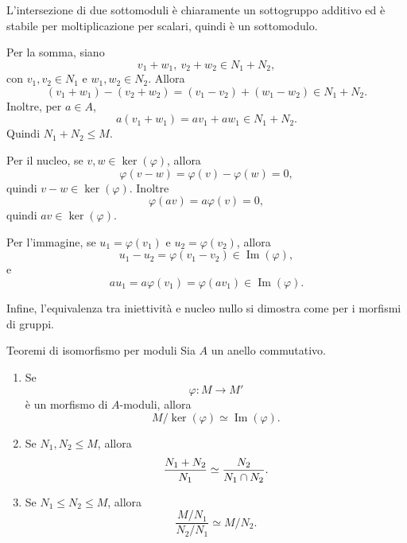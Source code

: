 \documentclass[a4paper]{article}
\begin{document}
\begin{radioactive}
\begin{snippetproof}{}
    L'intersezione di due sottomoduli è chiaramente un sottogruppo additivo ed è stabile per moltiplicazione per scalari, quindi è un sottomodulo.

    Per la somma, siano
    \[
        v_1+w_1,\ v_2+w_2\in N_1+N_2,
    \]
    con \(v_1,v_2\in N_1\) e \(w_1,w_2\in N_2\). Allora
    \[
        (v_1+w_1)-(v_2+w_2)
        =
        (v_1-v_2)+(w_1-w_2)\in N_1+N_2.
    \]
    Inoltre, per \(a\in A\),
    \[
        a(v_1+w_1)=av_1+aw_1\in N_1+N_2.
    \]
    Quindi \(N_1+N_2\leq M\).

    Per il nucleo, se \(v,w\in\ker(\varphi)\), allora
    \[
        \varphi(v-w)=\varphi(v)-\varphi(w)=0,
    \]
    quindi \(v-w\in\ker(\varphi)\). Inoltre
    \[
        \varphi(av)=a\varphi(v)=0,
    \]
    quindi \(av\in\ker(\varphi)\).

    Per l'immagine, se \(u_1=\varphi(v_1)\) e \(u_2=\varphi(v_2)\), allora
    \[
        u_1-u_2=\varphi(v_1-v_2)\in\operatorname{Im}(\varphi),
    \]
    e
    \[
        au_1=a\varphi(v_1)=\varphi(av_1)\in\operatorname{Im}(\varphi).
    \]

    Infine, l'equivalenza tra iniettività e nucleo nullo si dimostra come per i morfismi di gruppi.
\end{snippetproof}
\end{radioactive}

\begin{radioactive}
\begin{snippettheorem}{Teoremi di isomorfismo per moduli}
    Sia \(A\) un anello commutativo.
    \begin{enumerate}
        \item Se
        \[
            \varphi\colon M\to M'
        \]
        è un morfismo di \(A\)-moduli, allora
        \[
            M/\ker(\varphi)
            \simeq
            \operatorname{Im}(\varphi).
        \]

        \item Se \(N_1,N_2\leq M\), allora
        \[
            \frac{N_1+N_2}{N_1}
            \simeq
            \frac{N_2}{N_1\cap N_2}.
        \]

        \item Se \(N_1\leq N_2\leq M\), allora
        \[
            \frac{M/N_1}{N_2/N_1}
            \simeq
            M/N_2.
        \]
    \end{enumerate}
\end{snippettheorem}
\end{radioactive}
\end{document}
